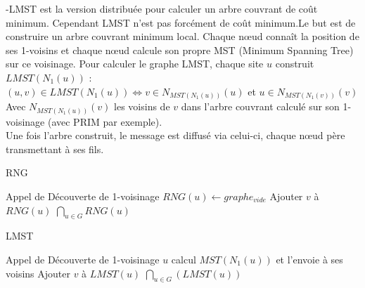 -LMST est la version distribuée pour calculer un arbre couvrant de coût minimum. Cependant LMST n'est pas forcément de 
coût minimum.Le but est de construire un arbre couvrant minimum local. Chaque nœud connaît la position de ses 1-voisins 
 et chaque nœud calcule son propre MST (Minimum Spanning Tree) sur ce voisinage.
Pour calculer le graphe LMST, chaque site $u$ construit $LMST(N_1(u))$ : \\
 $(u,v) \in LMST(N_1(u)) \Leftrightarrow v \in N_{MST(N_1(u))}(u)$ et $ u \in N_{MST(N_1(v))}(v)$\\
Avec $N_{MST(N_1(u))}(v)$ les voisins de $v$ dans l'arbre couvrant calculé sur son 1-voisinage (avec PRIM par exemple).\\
Une fois l'arbre construit, le message est diffusé via celui-ci, chaque nœud père transmettant à ses fils.




\begin{algorithm}[h]
\caption{RNG}
\label{RNG}
\begin{algorithmic}
	\STATE Appel de Découverte de 1-voisinage
\ENDFOR
{}
	\STATE  $RNG(u) \leftarrow graphe_{vide}$
	    \STATE Ajouter $v$ à $RNG(u)$
	  \ENDIF
        \ENDFOR
\ENDFOR
\RETURN $\bigcap_{u \in G} RNG(u)$
\end{algorithmic}
\end{algorithm}

\begin{algorithm}[h]
\caption{LMST}
\label{LMST}
\begin{algorithmic}
	\STATE Appel de Découverte de 1-voisinage
	\STATE $u$ calcul $MST(N_1(u))$ et l'envoie à ses voisins
\ENDFOR
{}
	    \STATE Ajouter $v$ à $LMST(u)$
	  \ENDIF
        \ENDFOR
\ENDFOR
\RETURN $\bigcap_{u \in G}( LMST(u))$
\end{algorithmic}
\end{algorithm}


